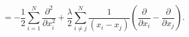 \begin{equation}
	= -\frac{1}{2} \sum_{i=1}^{N} \frac {\partial ^{2}}{\partial x_{i}^2} +
	\frac{\lambda}{2} \sum_{i\neq j}^{N} \frac {1}{(x_{i}-x_{j})}
	\left(
	\frac{\partial}{\partial x_{i}}-\frac {\partial}{\partial x_{j}}
	\right) .
\end{equation}

